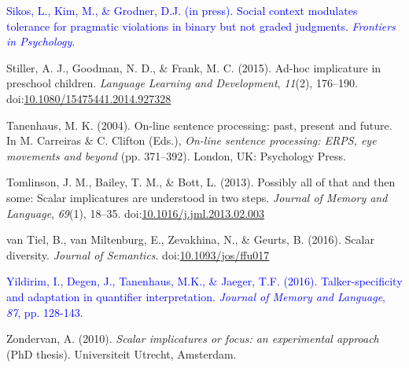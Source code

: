 \documentclass[man]{apa6}
\newcommand{\change}[1]{\textcolor{Blue}{#1}}
\theoremstyle{definition}
\theoremstyle{definition}
\theoremstyle{definition}
\theoremstyle{remark}
\begin{document}
\change{\hypertarget{ref-Sikos2019}{}
Sikos, L., Kim, M., \& Grodner, D.J. (in press). Social context modulates tolerance for pragmatic violations in binary but not graded judgments. \emph{Frontiers in Psychology}.}

\hypertarget{ref-Stiller2015}{}
Stiller, A. J., Goodman, N. D., \& Frank, M. C. (2015). Ad-hoc
implicature in preschool children. \emph{Language Learning and
Development}, \emph{11}(2), 176--190.
doi:\href{https://doi.org/10.1080/15475441.2014.927328}{10.1080/15475441.2014.927328}

\hypertarget{ref-Tanenhaus2004}{}
Tanenhaus, M. K. (2004). On-line sentence processing: past, present and
future. In M. Carreiras \& C. Clifton (Eds.), \emph{On-line sentence
processing: ERPS, eye movements and beyond} (pp. 371--392). London, UK:
Psychology Press.

\hypertarget{ref-Tomlinson2013}{}
Tomlinson, J. M., Bailey, T. M., \& Bott, L. (2013). Possibly all of
that and then some: Scalar implicatures are understood in two steps.
\emph{Journal of Memory and Language}, \emph{69}(1), 18--35.
doi:\href{https://doi.org/10.1016/j.jml.2013.02.003}{10.1016/j.jml.2013.02.003}

\hypertarget{ref-VanTiel2014}{}
van Tiel, B., van Miltenburg, E., Zevakhina, N., \& Geurts, B. (2016).
Scalar diversity. \emph{Journal of Semantics}.
doi:\href{https://doi.org/10.1093/jos/ffu017}{10.1093/jos/ffu017}

\change{\hypertarget{ref-Yildirim2016}{}
Yildirim, I., Degen, J., Tanenhaus, M.K., \& Jaeger, T.F. (2016). Talker-specificity and adaptation in quantifier interpretation. \emph{Journal of Memory and Language}, \emph{87}, pp. 128-143.}


\hypertarget{ref-Zondervan2010}{}
Zondervan, A. (2010). \emph{Scalar implicatures or focus: an
experimental approach} (PhD thesis). Universiteit Utrecht, Amsterdam.
\end{document}
